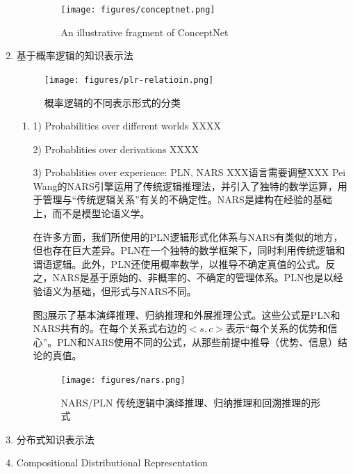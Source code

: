 \begin{enumerate}
\begin{enumerate}
\begin{figure}[htb]
\centering
\texttt{[image: figures/conceptnet.png]}
\caption{ An illustrative fragment of ConceptNet }
\label{fig:concept}
\end{figure}


\end{enumerate}

\item[2]  {基于概率逻辑的知识表示法}

\begin{figure}[htb]
\centering
\texttt{[image: figures/plr-relatioin.png]}
\caption{概率逻辑的不同表示形式的分类}
\label{fig:plr-relation}
\end{figure}

\begin{enumerate}

\item1) Probabilities over different worlds
XXXX

2) Probablities over derivations
XXXX

3) Probablities over experience: PLN, NARS
XXX语言需要调整XXX
Pei Wang的NARS引擎运用了传统逻辑推理法\cite{Wang2006}，并引入了独特的数学运算，用于管理与“传统逻辑关系”有关的不确定性。NARS是建构在经验的基础上，而不是模型论语义学。

在许多方面，我们所使用的PLN逻辑形式化体系与NARS有类似的地方，但也存在巨大差异。PLN在一个独特的数学框架下，同时利用传统逻辑和谓语逻辑。此外，PLN还使用概率数学，以推导不确定真值的公式。反之，NARS是基于原始的、非概率的、不确定的管理体系。PLN也是以经验语义为基础，但形式与NARS不同。


图\ref{fig:nars}展示了基本演绎推理、归纳推理和外展推理公式。这些公式是PLN和NARS共有的。在每个关系式右边的$<s,c>$表示“每个关系的优势和信心”。PLN和NARS使用不同的公式，从那些前提中推导（优势、信息）结论的真值。

\begin{figure}[htb]
\centering
\texttt{[image: figures/nars.png]}
\caption{ NARS/PLN 传统逻辑中演绎推理、归纳推理和回溯推理的形式 }
\label{fig:nars}
\end{figure}


\end{enumerate}

\item[3]  {分布式知识表示法}



\item[4]  {Compositional Distributional Representation}



\end{enumerate}






